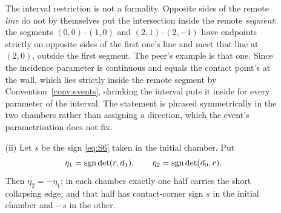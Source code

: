 \begin{lemma}
\begin{enumerate}
\begin{enumerate}
The interval restriction is not a formality. Opposite sides of the remote
\emph{line} do not by themselves put the intersection inside the remote
\emph{segment}: the segments $(0,0)$--$(1,0)$ and $(2,1)$--$(2,-1)$ have
endpoints strictly on opposite sides of the first one's line and meet that line
at $(2,0)$, outside the first segment. The peer's example is that one. Since the
incidence parameter is continuous and equals the contact point's at the wall,
which lies strictly inside the remote segment by
Convention~\ref{conv:events}, shrinking the interval puts it inside for every
parameter of the interval. The statement is phrased symmetrically in the two
chambers rather than assigning a direction, which the event's parametrisation
does not fix.
\item[(ii)] Let $s$ be the sign
\eqref{eq:S6} taken in the initial chamber. Put
\[
   \eta_1=\operatorname{sgn}\det(r,d_1),\qquad \eta_2=\operatorname{sgn}\det(d_0,r).
\]
Then $\eta_2=-\eta_1$; in each chamber exactly one half carries the short
collapsing edge; and that half has contact-corner sign $s$ in the initial
chamber and $-s$ in the other.


\end{enumerate}
\end{enumerate}
\end{lemma}
